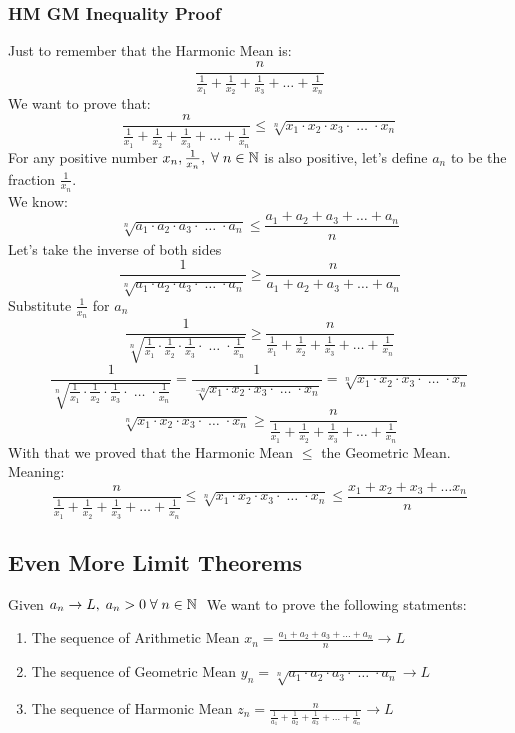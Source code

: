 \subsubsection{HM GM Inequality Proof}
Just to remember that the Harmonic Mean is:
\[
    \frac{n}{\frac{1}{x_1}+\frac{1}{x_2}+\frac{1}{x_3}+\ldots+\frac{1}{x_n}}
\]
We want to prove that:
\[
    \frac{n}{\frac{1}{x_1}+\frac{1}{x_2}+\frac{1}{x_3}+\ldots+\frac{1}{x_n}}\leq \sqrt[n]{x_1\cdot x_2\cdot x_3\cdot\;\ldots\; \cdot x_n}
\]
For any positive number $x_n, \frac{1}{x_n},\; \forall\; n\in \mathbb{N}$ is also positive, let's define $a_n$ to be the fraction $\frac{1}{x_n}$.\\
We know:
\[
    \sqrt[n]{a_1\cdot a_2\cdot a_3\cdot\;\ldots\;\cdot a_n}\leq \frac{a_1+a_2+a_3+\ldots+a_n}{n}
\]
Let's take the inverse of both sides
\[
    \frac{1}{\sqrt[n]{a_1\cdot a_2\cdot a_3\cdot\;\ldots\;\cdot a_n}} \geq \frac{n}{a_1+a_2+a_3+\ldots+a_n}
\]
Substitute $\frac{1}{x_n}$ for $a_n$
\[
    \frac{1}{\sqrt[n]{\frac{1}{x_1}\cdot \frac{1}{x_2}\cdot \frac{1}{x_3}\cdot\;\ldots\;\cdot \frac{1}{x_n}}} \geq \frac{n}{\frac{1}{x_1}+\frac{1}{x_2}+\frac{1}{x_3}+\ldots+\frac{1}{x_n}}
\]
\[
    \frac{1}{\sqrt[n]{\frac{1}{x_1}\cdot \frac{1}{x_2}\cdot \frac{1}{x_3}\cdot\;\ldots\;\cdot \frac{1}{x_n}}} = \frac{1}{\sqrt[-n]{x_1\cdot x_2\cdot x_3\cdot\; \ldots\; \cdot x_n}} = \sqrt[n]{x_1\cdot x_2\cdot x_3\cdot\; \ldots\; \cdot x_n}
\]
\[
    \sqrt[n]{x_1\cdot x_2\cdot x_3\cdot\; \ldots\; \cdot x_n} \geq   \frac{n}{\frac{1}{x_1}+\frac{1}{x_2}+\frac{1}{x_3}+\ldots+\frac{1}{x_n}}
\]
With that we proved that the Harmonic Mean $\leq$ the Geometric Mean.\\
Meaning:
\[
    \frac{n}{\frac{1}{x_1}+\frac{1}{x_2}+\frac{1}{x_3}+\ldots+\frac{1}{x_n}}\leq \sqrt[n]{x_1\cdot x_2\cdot x_3\cdot\; \ldots\; \cdot x_n}\leq \frac{x_1+x_2+x_3+\ldots x_n}{n}
\]
\subsection{Even More Limit Theorems}
Given $a_n \rightarrow L,\; a_n>0 \;\forall\; n\in \mathbb{N} \;$ We want to prove the following statments:\\
\begin{enumerate}
    \item The sequence of Arithmetic Mean $x_n = \frac{a_1+a_2+a_3+\ldots+a_n}{n} \rightarrow L$
    \item The sequence of Geometric Mean $y_n = \sqrt[n]{a_1\cdot a_2\cdot a_3\cdot\; \ldots\;\cdot a_n} \rightarrow L$
    \item The sequence of Harmonic Mean $z_n = \frac{n}{\frac{1}{a_1}+\frac{1}{a_2}+\frac{1}{a_3}+\ldots+\frac{1}{a_n}}\rightarrow L$
\end{enumerate}
